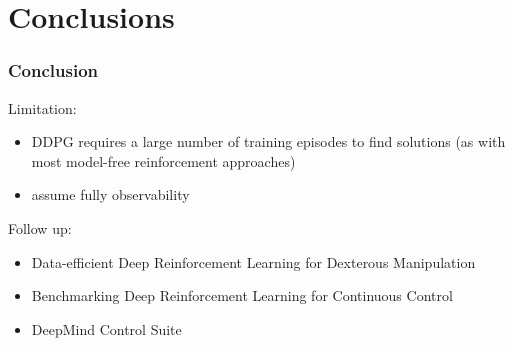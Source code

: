 \section{Conclusions}

\begin{frame}
\frametitle{Conclusion}
Limitation:
\begin{itemize}
  \item DDPG requires a large number of training episodes to find solutions
  (as with most model-free reinforcement approaches)
  \item assume fully observability
\end{itemize}

Follow up:
\begin{itemize}
\item Data-efficient Deep Reinforcement Learning for Dexterous Manipulation
\item Benchmarking Deep Reinforcement Learning for Continuous Control
\item DeepMind Control Suite
\end{itemize}

\end{frame}

